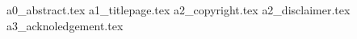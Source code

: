 \documentclass[12pt]{report}
\begin{document}
\copyrightfalse
 {a0_abstract.tex}
 {a1_titlepage.tex}
 {a2_copyright.tex}
 {a2_disclaimer.tex}
 {a3_acknoledgement.tex}
\setlength{\parskip}{0.1 in}

\makecontentspages

\chapterpages

\newif \ifFIGS
\FIGSfalse


\graphicspath{{Paper2Figures/}}

\graphicspath{{Paper3Figures/}}

\graphicspath{{Paper4Figures/}}

\graphicspath{{Figures/}}

\graphicspath{{Paper5Figures/}}

\graphicspath{{repositoryFigures/}}





\end{document}
